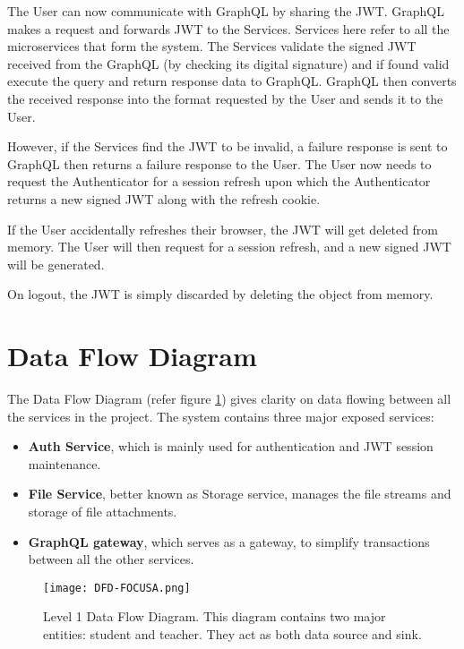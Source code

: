 The User can now communicate with GraphQL by sharing the JWT.
GraphQL makes a request and forwards JWT to the Services. Services here refer to all the microservices that form the system.
The Services validate the signed JWT received from the GraphQL (by checking its digital signature) 
and if found valid execute the query and return response data to GraphQL.
GraphQL then converts the received response into the format requested by the User and sends it to the User.

However, if the Services find the JWT to be invalid, a failure response is sent to
GraphQL then returns a failure response to the User.
The User now needs to request the Authenticator for a session refresh upon which the Authenticator
returns a new signed JWT along with the refresh cookie.

If the User accidentally refreshes their browser, the JWT will get deleted from memory. 
The User will then request for a session refresh, and a new signed JWT will be generated.

On logout, the JWT is simply discarded by deleting the object from memory.

\section{Data Flow Diagram}

The Data Flow Diagram (refer figure \ref{fig:dfd}) gives clarity on data flowing between all the services in the project. 
The system contains three major exposed services:
\begin{itemize}
    \item \textbf{Auth Service}, which is mainly used for authentication and JWT session maintenance.
    \item \textbf{File Service}, better known as Storage service, manages the file streams and storage of file attachments.
    \item \textbf{GraphQL gateway}, which serves as a gateway, to simplify transactions between all the other services.
\end{itemize}

\begin{figure}[h!]
    \begin{center}
        \texttt{[image: DFD-FOCUSA.png]}
    \end{center}
    \caption{Level 1 Data Flow Diagram. This diagram contains two major entities: student and teacher. 
    They act as both data source and sink.}
    \label{fig:dfd}
\end{figure}

